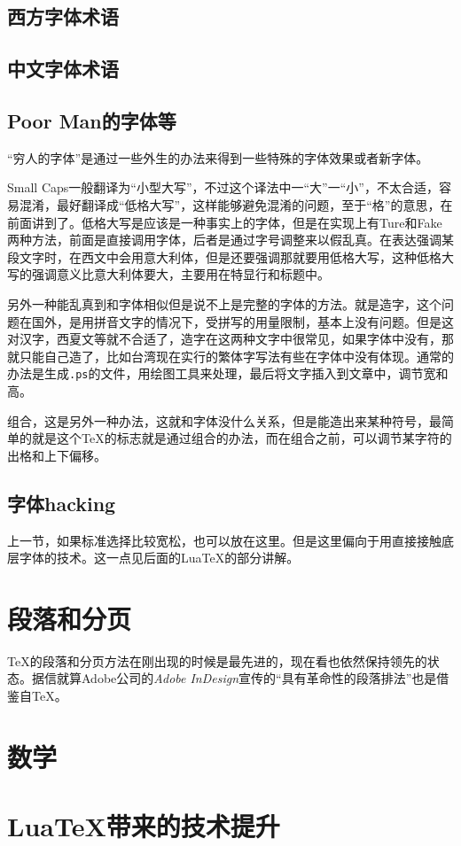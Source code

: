 \documentclass{article}
\begin{document}
\subsection{西方字体术语}
\subsection{中文字体术语}
\subsection{Poor Man的字体等}
“穷人的字体”是通过一些外生的办法来得到一些特殊的字体效果或者新字体。

Small Caps一般翻译为“小型大写”，不过这个译法中一“大”一“小”，不太合适，容易混淆，最好翻译成“低格大写”，这样能够避免混淆的问题，至于“格”的意思，在前面讲到了。低格大写是应该是一种事实上的字体，但是在实现上有Ture和Fake两种方法，前面是直接调用字体，后者是通过字号调整来以假乱真。在表达强调某段文字时，在西文中会用意大利体，但是还要强调那就要用低格大写，这种低格大写的强调意义比意大利体要大，主要用在特显行和标题中。

另外一种能乱真到和字体相似但是说不上是完整的字体的方法。就是造字，这个问题在国外，是用拼音文字的情况下，受拼写的用量限制，基本上没有问题。但是这对汉字，西夏文等就不合适了，造字在这两种文字中很常见，如果字体中没有，那就只能自己造了，比如台湾现在实行的繁体字写法有些在字体中没有体现。通常的办法是生成\verb!.ps!的文件，用绘图工具来处理，最后将文字插入到文章中，调节宽和高。

组合，这是另外一种办法，这就和字体没什么关系，但是能造出来某种符号，最简单的就是这个\TeX 的标志就是通过组合的办法，而在组合之前，可以调节某字符的出格和上下偏移。
\subsection{字体hacking}
上一节，如果标准选择比较宽松，也可以放在这里。但是这里偏向于用直接接触底层字体的技术。这一点见后面的Lua\TeX 的部分讲解。

\section{段落和分页}
\TeX 的段落和分页方法在刚出现的时候是最先进的，现在看也依然保持领先的状态。据信就算Adobe公司的\textsl{Adobe InDesign}宣传的“具有革命性的段落排法”也是借鉴自\TeX 。
\section{数学}
\section{Lua\TeX 带来的技术提升}
\end{document}
